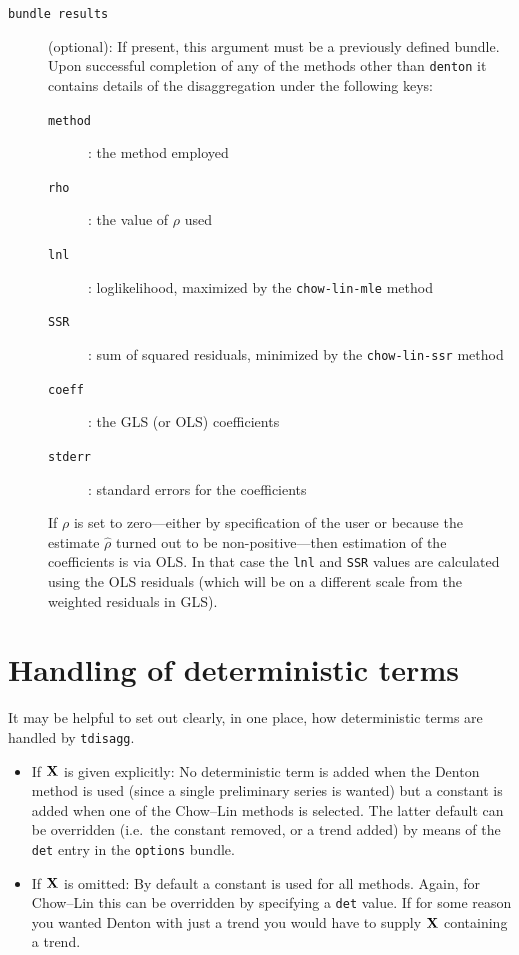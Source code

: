 \begin{description}
\item[\texttt{bundle results}](optional): If present, this argument
  must be a previously defined bundle. Upon successful completion of
  any of the methods other than \texttt{denton} it contains details of
  the disaggregation under the following keys:
  \begin{description}
  \item[\texttt{method}]: the method employed
  \item[\texttt{rho}]: the value of $\rho$ used
  \item[\texttt{lnl}]: loglikelihood, maximized by the
    \texttt{chow-lin-mle} method
  \item[\texttt{SSR}]: sum of squared residuals, minimized by the
    \texttt{chow-lin-ssr} method
  \item[\texttt{coeff}]: the GLS (or OLS) coefficients
  \item[\texttt{stderr}]: standard errors for the coefficients
  \end{description}
  If $\rho$ is set to zero---either by specification of the user or
  because the estimate $\hat{\rho}$ turned out to be
  non-positive---then estimation of the coefficients is via OLS. In
  that case the \texttt{lnl} and \texttt{SSR} values are calculated
  using the OLS residuals (which will be on a different scale from the
  weighted residuals in GLS).
\end{description}

\section{Handling of deterministic terms}
\label{sec:tdisagg-det}

It may be helpful to set out clearly, in one place, how deterministic
terms are handled by \texttt{tdisagg}.
\begin{itemize}
\item If $\mathbf{X}$ is given explicitly: No deterministic term is added
  when the Denton method is used (since a single preliminary series is
  wanted) but a constant is added when one of the Chow--Lin methods is
  selected. The latter default can be overridden (i.e.\ the constant
  removed, or a trend added) by means of the \texttt{det} entry in the
  \texttt{options} bundle.
\item If $\mathbf{X}$ is omitted: By default a constant is used for all
  methods. Again, for Chow--Lin this can be overridden by specifying a
  \texttt{det} value. If for some reason you wanted Denton with just a
  trend you would have to supply $\mathbf{X}$ containing a trend.
\end{itemize}

